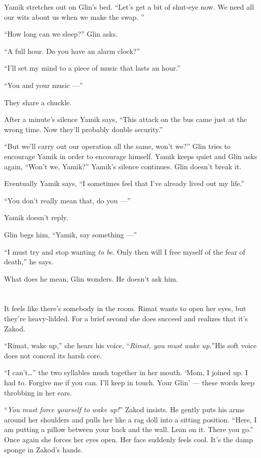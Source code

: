 \documentclass[twoside,11pt,openany]{book}
\begin{document}
Yamik stretches out on Glin's bed. ``Let's get a bit of shut-eye now. We need all our wits about us when we
make the swap. ''

``How long can we sleep?'' Glin asks.

``A full hour. Do you have an alarm clock?''

``I'll set my mind to a piece of music that lasts an hour.''

``You and your music ---''

They share a chuckle.

After a minute's silence Yamik says, ``This attack on the bus came just at the wrong time. Now they'll
probably double security.''

``But we'll carry out our operation all the same, won't we?'' Glin tries to encourage Yamik in
order to encourage himself. Yamik keeps quiet and Glin asks again, ``Won't we, Yamik?''
Yamik's silence continues. Glin doesn't break it.

Eventually Yamik says, ``I sometimes feel that I've already lived out my life.''

``You don't really mean that, do you ---''

Yamik doesn't reply.

Glin begs him, ``Yamik, say something ---''

``I must try and stop wanting \textit{to be}. Only then will I free myself of the fear of
death,'' he says.

What does he mean,  Glin wonders.  He doesn't ask him.


\bigskip

\chapter{}

It feels like there's somebody in the room. Rimat wants to open her eyes, but they're heavy-lidded. For a brief
second she does succeed and realizes that it's Zakod.

``Rimat, wake up,'' she hears his voice, ``\textit{Rimat, you must wake up.}{}''His soft voice
does not conceal its harsh core.

``I can't{\ldots}''  the two syllables mush together in her mouth. `Mom, I joined up. I had to. Forgive me if you
can. I'll keep in touch. Your Glin' --- these  words  keep  throbbing  in her ears.

``\textit{You must force yourself to wake up!}{}'' \textit{ } Zakod insists. He gently puts his arms around her
shoulders and pulls her like a rag doll into a sitting position. ``Here, I am putting a pillow between your back and
the wall. Lean on it. There you go.{}'' Once again she forces her eyes open. Her face suddenly feels cool.
It's   the damp sponge in Zakod's hands.
\end{document}
